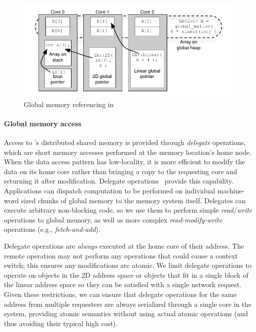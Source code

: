 \begin{figure}[t]
\begin{center}
  \includegraphics[width=0.95\columnwidth]{figs/memory-structure}
\begin{minipage}{0.95\columnwidth}
  \caption{\label{fig:memory-structure} Global memory referencing in \Grappa}
\end{minipage}
\vspace{-3ex}
\end{center}
\end{figure}

\paragraph{Global memory access} 
Access to \Grappa's distributed shared memory is provided through  {\em
delegate} operations, which are short memory accesses performed at the memory
location's home node. When the data access pattern has
low-locality, it is more efficient to modify the data on its home core rather
than bringing a copy to the requesting core and returning it after
modification. Delegate operations~\cite{Nelson:hotpar11, delegated:oopsla11}
provide this capability. Applications can dispatch computation to be performed
on individual machine-word sized chunks of global memory to the memory system
itself. Delegates can execute arbitrary non-blocking code, so we use them to perform simple
\emph{read\/}/\emph{write\/} operations to global memory, as well as more complex \emph{read-modify-write\/} operations (e.g., \emph{fetch-and-add\/}). 

Delegate operations are \emph{always\/} executed at the home core of their
address. The remote operation may not perform any operations that could cause
a context switch; this ensures any modifications are atomic. We limit delegate
operations to operate on objects in the 2D address space or objects that fit
in a single block of the linear address space so they can be satisfied with a
single network request. Given these restrictions, we can ensure that delegate
operations for the same address from multiple requesters are always serialized
through a single core in the system, providing atomic semantics without using
actual atomic operations (and thus avoiding their typical high cost).

